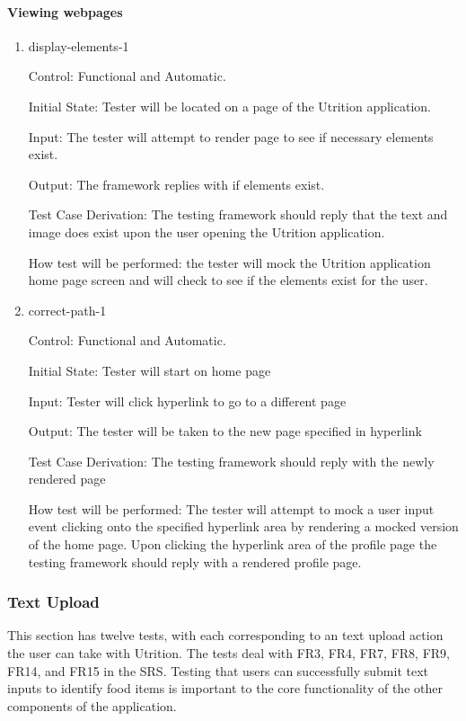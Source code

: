\documentclass[12pt, titlepage]{article}
\begin{document}
	\paragraph{Viewing webpages}

	\begin{enumerate}
		\item{display-elements-1\\}
		
		Control: Functional and Automatic.
		
		Initial State: Tester will be located on a page of the Utrition application.
		
		Input: The tester will attempt to render page to see if necessary elements exist.
		
		Output: The framework replies with if elements exist.
		
		Test Case Derivation: The testing framework should reply that the text and image does exist upon the user opening the Utrition application.
		
		How test will be performed: the tester will mock the Utrition application home page screen and will check to see if the elements exist for the user.
		
		\item{correct-path-1\\}
		
		Control: Functional and Automatic.
		
		Initial State: Tester will start on home page
		
		Input: Tester will click hyperlink to go to a different page
		
		Output: The tester will be taken to the new page specified in hyperlink
		
		Test Case Derivation: The testing framework should reply with the newly rendered page
		
		How test will be performed: The tester will attempt to mock a user input event clicking onto the specified hyperlink area by rendering a mocked version of the home page. Upon clicking the hyperlink area of the profile page the testing framework should reply with a rendered profile page.
	\end{enumerate}

	\subsubsection{Text Upload}
	This section has twelve tests, with each corresponding to an text upload action the user can take with Utrition. The tests deal with FR3, FR4, FR7, FR8, FR9, FR14, and FR15 in the SRS. Testing that users can successfully submit text inputs to identify food items is 
	important to the core functionality of the other components of the 
	application.
	
\end{document}
